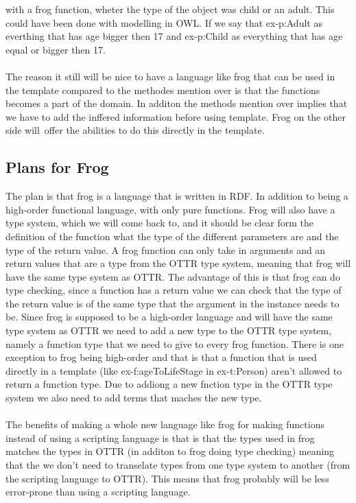 with a frog function, wheter the type of the object was child or an adult. This could have been done with modelling in OWL. If we say that  
ex-p:Adult as everthing that has age bigger then 17 and ex-p:Child as everything that has age equal or bigger then 17.
\\ \\
The reason it still will be nice to have a language like frog that can be used in the template compared to the 
methodes mention over is that the functions becomes a part of the domain. In additon the methods mention over implies
that we have to add the inffered information before using template. Frog on the other side will offer the abilities to 
do this directly in the template. 

\subsection{Plans for Frog}
The plan is that frog is a language that is written in RDF. In addition to being a high-order functional language, 
with only pure functions. 
Frog will also have a type system, which we will come back to, and it should be clear form the definition of 
the function what the type of the different parameters are and the type of the return value. 
A frog function can only take in arguments and an return values that are a type from the OTTR type system, 
meaning that frog will have the same type system as OTTR.
The advantage of this is that frog can do type checking, since a function has a return value we can check that 
the type of the return value is of the same type that the argument in the instance needs to be.
Since frog is supposed to be a high-order language and will have the same type system as OTTR  
we need to add a new type to the OTTR type system, namely a function type that we need to give to every frog function. 
There is one exception to frog being high-order and that is that a function that is used directly in a 
template (like ex-f:ageToLifeStage in ex-t:Person) aren't allowed to return a function type. Due to addiong a new 
fnction type in the OTTR type system we also need to add terms that maches the new type. 
\\ \\
The benefits of making a whole new language like frog for making functions instead of using a scripting language is 
that is that the types used in frog matches the types in OTTR (in additon to frog doing type checking) meaning that 
the we don't need to transelate types from one type system to another (from the scripting language to OTTR). This means 
that frog probably will be less error-prone than using a scripting language. 